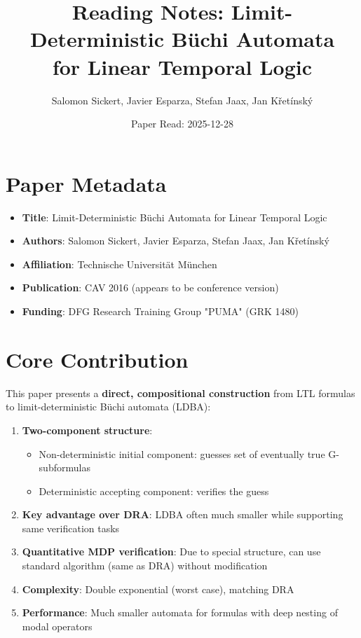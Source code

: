 \documentclass{article}
\title{Reading Notes: Limit-Deterministic Büchi Automata\\
for Linear Temporal Logic}
\author{Salomon Sickert, Javier Esparza, Stefan Jaax, Jan Křetínský}
\date{Paper Read: 2025-12-28}
\begin{document}
\maketitle

\section{Paper Metadata}

\begin{itemize}
    \item \textbf{Title}: Limit-Deterministic Büchi Automata for Linear Temporal Logic
    \item \textbf{Authors}: Salomon Sickert, Javier Esparza, Stefan Jaax, Jan Křetínský
    \item \textbf{Affiliation}: Technische Universität München
    \item \textbf{Publication}: CAV 2016 (appears to be conference version)
    \item \textbf{Funding}: DFG Research Training Group "PUMA" (GRK 1480)
\end{itemize}

\section{Core Contribution}

This paper presents a \textbf{direct, compositional construction} from LTL formulas to limit-deterministic Büchi automata (LDBA):

\begin{enumerate}
    \item \textbf{Two-component structure}:
    \begin{itemize}
        \item Non-deterministic initial component: guesses set of eventually true G-subformulas
        \item Deterministic accepting component: verifies the guess
    \end{itemize}

    \item \textbf{Key advantage over DRA}: LDBA often much smaller while supporting same verification tasks

    \item \textbf{Quantitative MDP verification}: Due to special structure, can use standard algorithm (same as DRA) without modification

    \item \textbf{Complexity}: Double exponential (worst case), matching DRA

    \item \textbf{Performance}: Much smaller automata for formulas with deep nesting of modal operators
\end{enumerate}
\end{document}
